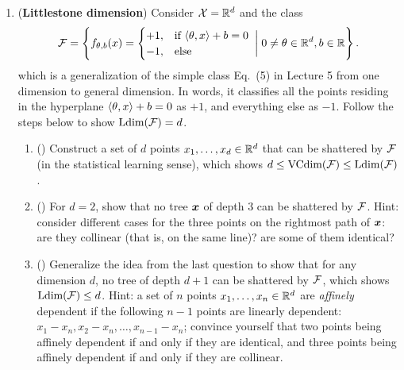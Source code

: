 \documentclass{article}
\begin{document}
\begin{enumerate}[leftmargin=*,align=left]
\begin{enumerate}[leftmargin=*,align=left]
\end{enumerate}

\newpage
\item
({\bf Littlestone dimension})
Consider ${\mathcal{X}} = \mathbb{R}^d$ and the class 
\begin{equation*}\label{eqn:simple_class}
{\mathcal{F}} = \left\{f_{\theta,b}(x) = \begin{cases}
+1, &\text{if $\left\langle \theta,x \right\rangle+b=0$} \\
-1, &\text{else}
\end{cases} \;\bigg\rvert\; 0 \neq \theta \in \mathbb{R}^d, b \in \mathbb{R}\right\}.
\end{equation*}
which is a generalization of the simple class Eq.~(5) in Lecture 5 from one dimension to general dimension.
In words, it classifies all the points residing in the hyperplane $\left\langle \theta,x \right\rangle+b=0$ as $+1$, and everything else as $-1$.
Follow the steps below to show ${\text{\rm Ldim}}({\mathcal{F}}) = d$.

\begin{enumerate}[leftmargin=*,align=left]
\vspace{5pt}
\item () 
Construct a set of $d$ points $x_1, \ldots, x_d \in \mathbb{R}^d$ that can be shattered by ${\mathcal{F}}$ (in the statistical learning sense), which shows $d \leq {\text{\rm VCdim}}({\mathcal{F}}) \leq {\text{\rm Ldim}}({\mathcal{F}})$. \\


\vspace{5pt}
\item () 
For $d = 2$, show that no tree ${\boldsymbol{x}}$ of depth $3$ can be shattered by ${\mathcal{F}}$.
Hint: consider different cases for the three points on the rightmost path of ${\boldsymbol{x}}$: are they collinear (that is, on the same line)? are some of them identical? \\


\vspace{5pt}
\item () 
Generalize the idea from the last question to show that for any dimension $d$, no tree of depth $d+1$ can be shattered by ${\mathcal{F}}$, which shows ${\text{\rm Ldim}}({\mathcal{F}}) \leq d$. 
Hint: a set of $n$ points $x_1, \ldots, x_n \in \mathbb{R}^d$ are \textit{affinely} dependent if the following $n-1$ points are linearly dependent: $x_1 - x_n, x_2-x_n, \ldots, x_{n-1}-x_{n}$; 
convince yourself that two points being affinely dependent if and only if they are identical, and three points being affinely dependent if and only if they are collinear. \\



\end{enumerate}
\end{enumerate}
\end{document}
